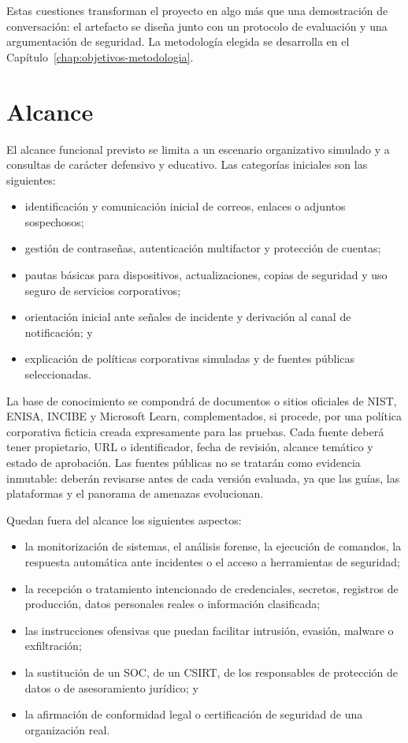 \documentclass[12pt,twoside,titlepage]{book}
\begin{document}
Estas cuestiones transforman el proyecto en algo más que una demostración de
conversación: el artefacto se diseña junto con un protocolo de evaluación y una
argumentación de seguridad. La metodología elegida se desarrolla en el
Capítulo~\ref{chap:objetivos-metodologia}.

\section{Alcance}
\label{sec:alcance}

El alcance funcional previsto se limita a un escenario organizativo simulado y
a consultas de carácter defensivo y educativo. Las categorías iniciales son las
siguientes:

\begin{itemize}
  \item identificación y comunicación inicial de correos, enlaces o adjuntos
  sospechosos;
  \item gestión de contraseñas, autenticación multifactor y protección de
  cuentas;
  \item pautas básicas para dispositivos, actualizaciones, copias de seguridad y
  uso seguro de servicios corporativos;
  \item orientación inicial ante señales de incidente y derivación al canal de
  notificación; y
  \item explicación de políticas corporativas simuladas y de fuentes públicas
  seleccionadas.
\end{itemize}

La base de conocimiento se compondrá de documentos o sitios oficiales de NIST,
ENISA, INCIBE y Microsoft Learn, complementados, si procede, por una política
corporativa ficticia creada expresamente para las pruebas. Cada fuente deberá
tener propietario, URL o identificador, fecha de revisión, alcance temático y
estado de aprobación. Las fuentes públicas no se tratarán como evidencia
inmutable: deberán revisarse antes de cada versión evaluada, ya que las guías,
las plataformas y el panorama de amenazas evolucionan.

Quedan fuera del alcance los siguientes aspectos:

\begin{itemize}
  \item la monitorización de sistemas, el análisis forense, la ejecución de
  comandos, la respuesta automática ante incidentes o el acceso a herramientas
  de seguridad;
  \item la recepción o tratamiento intencionado de credenciales, secretos,
  registros de producción, datos personales reales o información clasificada;
  \item las instrucciones ofensivas que puedan facilitar intrusión, evasión,
  malware o exfiltración;
  \item la sustitución de un SOC, de un CSIRT, de los responsables de protección
  de datos o de asesoramiento jurídico; y
  \item la afirmación de conformidad legal o certificación de seguridad de una
  organización real.
\end{itemize}
\end{document}
